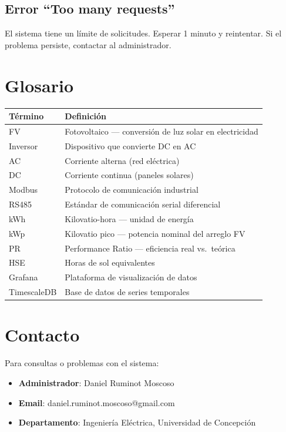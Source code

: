 \documentclass[12pt,a4paper]{article}
\begin{document}
\subsection{Error ``Too many requests''}

El sistema tiene un l\'imite de solicitudes. Esperar 1 minuto y reintentar. Si el problema persiste, contactar al administrador.

\section{Glosario}

\begin{table}[H]
\centering
\begin{tabular}{ll}
\toprule
\textbf{T\'ermino} & \textbf{Definici\'on} \\
\midrule
FV & Fotovoltaico --- conversi\'on de luz solar en electricidad \\
Inversor & Dispositivo que convierte DC en AC \\
AC & Corriente alterna (red el\'ectrica) \\
DC & Corriente continua (paneles solares) \\
Modbus & Protocolo de comunicaci\'on industrial \\
RS485 & Est\'andar de comunicaci\'on serial diferencial \\
kWh & Kilovatio-hora --- unidad de energ\'ia \\
kWp & Kilovatio pico --- potencia nominal del arreglo FV \\
PR & Performance Ratio --- eficiencia real vs.\ te\'orica \\
HSE & Horas de sol equivalentes \\
Grafana & Plataforma de visualizaci\'on de datos \\
TimescaleDB & Base de datos de series temporales \\
\bottomrule
\end{tabular}
\end{table}

\section{Contacto}

Para consultas o problemas con el sistema:

\begin{itemize}
    \item \textbf{Administrador}: Daniel Ruminot Moscoso
    \item \textbf{Email}: daniel.ruminot.moscoso@gmail.com
    \item \textbf{Departamento}: Ingenier\'ia El\'ectrica, Universidad de Concepci\'on
\end{itemize}
\end{document}
